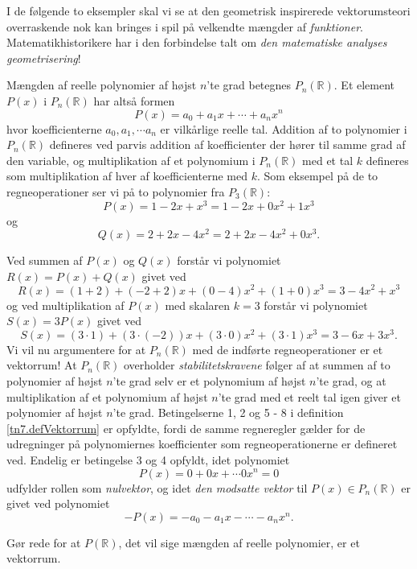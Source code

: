I de følgende to eksempler skal vi se at den geometrisk inspirerede vektorumsteori overraskende nok kan bringes i spil på velkendte mængder af \textit{funktioner}. Matema\-tikhistorikere har i den forbindelse talt om \textit{den matematiske analyses geometrisering}!

\begin{example}\label{tn7.pol1}
Mængden af reelle polynomier af højst $n$'te grad betegnes $P_n(\mathbb R)$. Et element $P(x)$ i $P_n(\mathbb R)$ har altså formen
\begin{equation}
P(x)=a_0+a_1x+\cdots+a_nx^n
\end{equation}
hvor koefficienterne $a_0,a_1,\cdots a_n$ er vilkårlige reelle tal. Addition af to polynomier i $P_n(\mathbb R)$ defineres ved parvis addition af koefficienter der hører til samme grad af den variable, og multiplikation af et polynomium i $P_n(\mathbb R)$ med et tal $k$ defineres som multiplikation af hver af koefficienterne med $k$. Som eksempel på de to regneoperationer ser vi på to polynomier fra $P_3(\mathbb R)$:
$$
P(x)=1-2x+x^3=1-2x+0x^2+1x^3
$$
og
$$
Q(x)=2+2x-4x^2=2+2x-4x^2+0x^3.
$$

Ved summen af $P(x)$ og $Q(x)$ forstår vi polynomiet $R(x)=P(x)+Q(x)$ givet ved
$$
R(x)=(1+2)+(-2+2)x+(0-4)x^2+(1+0)x^3=3-4x^2+x^3
$$
og ved multiplikation af $P(x)$ med skalaren $k=3$ forstår vi polynomiet $S(x)=3P(x)$ givet ved
$$
S(x)=(3\cdot1)+(3\cdot(-2))x+(3\cdot0)x^2+(3\cdot1)x^3=3-6x+3x^3.
$$
Vi vil nu argumentere for at $P_n(\mathbb R)$ med de indførte regneoperationer er et vektorrum! At $P_n(\mathbb R)$ overholder \textit{stabilitetskravene} følger af at summen af to polynomier af højst $n$'te grad selv er et polynomium af højst $n$'te grad, og at multiplikation af et polynomium af højst $n$'te grad med et reelt tal igen giver et polynomier af højst $n$'te grad. Betingelserne 1, 2 og 5 - 8 i definition \ref{tn7.defVektorrum} er opfyldte, fordi de samme regneregler gælder for de udregninger på polynomiernes koefficienter som regneoperationerne er defineret ved. Endelig er betingelse 3 og 4 opfyldt, idet polynomiet 
$$
P(x)=0+0x+\cdots 0x^n=0
$$
udfylder rollen som \textit{nulvektor}, og idet \textit{den modsatte vektor} til $P(x)\in P_n(\mathbb R)$ er givet ved polynomiet
$$
-P(x)=-a_0-a_1x-\cdots-a_nx^n.
$$
\end{example}

\begin{exercise}
Gør rede for at $P(\mathbb R)$, det vil sige mængden af reelle polynomier, er et vektorrum.
\end{exercise}

